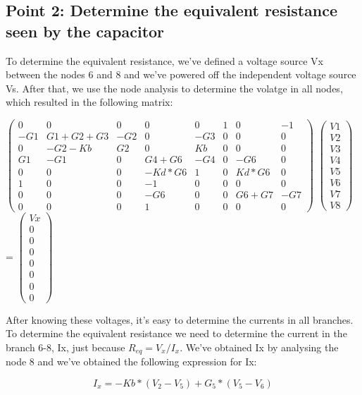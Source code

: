 \subsection{Point 2: Determine the equivalent resistance seen by the capacitor}

To determine the equivalent resistance, we've defined a voltage source Vx between the nodes 6 and 8 and we've powered off the independent voltage source Vs. After that, we use the node analysis to determine the volatge in all nodes, which resulted in the following matrix:

$\begin{pmatrix}
0 & 0 & 0 & 0 & 0 & 1 & 0 & -1\\
-G1 & G1+G2+G3 & -G2 & 0 & -G3 & 0 & 0 & 0\\
0 & -G2-Kb & G2 & 0 & Kb & 0 & 0 & 0 \\
G1 & -G1 & 0 & G4+G6 & -G4 & 0 & -G6 & 0\\
0 & 0 & 0 & -Kd*G6 & 1 & 0 & Kd*G6 & 0 \\
1 & 0 & 0 & -1 & 0 & 0 & 0 & 0\\
0 & 0 & 0 & -G6 & 0 & 0 & G6+G7 & -G7  \\ 
0 & 0 & 0 & 1 & 0 & 0 & 0 & 0
\end{pmatrix}$
$\begin{pmatrix}
V1\\
V2\\
V3\\
V4\\
V5\\
V6\\
V7\\
V8
\end{pmatrix}$
=
$\begin{pmatrix}
Vx\\
0\\
0\\
0\\
0\\
0\\
0\\
0
\end{pmatrix}$

After knowing these voltages, it's easy to determine the currents in all branches. To determine the equivalent resistance we need to determine the current in the branch 6-8, Ix, just because $R_{eq}=V_{x}/I_{x}$. We've obtained Ix by analysing the node 8 and we've obtained the following expression for Ix:

\begin{equation}
I_x = -Kb*(V_2 - V_5) + G_5*(V_5 - V_6) 
\end{equation}

